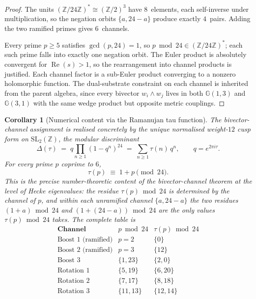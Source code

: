 \documentclass[11pt,a4paper]{article}
\theoremstyle{plain}
\newtheorem{corollary}[theorem]{Corollary}
\theoremstyle{definition}
\theoremstyle{remark}
\numberwithin{equation}{section}
\newcommand{\Cl}{\mathbb{G}}
\begin{document}
\begin{proof}
The units \((\mathbb{Z}/24\mathbb{Z})^*\cong(\mathbb{Z}/2)^3\) have
\(8\)~elements, each self-inverse under multiplication, so the negation
orbits \(\{a,24-a\}\) produce exactly \(4\)~pairs.  Adding the two
ramified primes gives \(6\)~channels.

Every prime \(p\ge5\) satisfies \(\gcd(p,24)=1\), so
\(p\bmod 24\in(\mathbb{Z}/24\mathbb{Z})^*\); each such prime falls
into exactly one negation orbit.  The Euler product is absolutely
convergent for \(\operatorname{Re}(s)>1\), so the rearrangement into
channel products is justified.  Each channel factor is a sub-Euler
product converging to a nonzero holomorphic function.  The
dual-substrate constraint on each channel is inherited from the parent
algebra, since every bivector \(w_i\wedge w_j\) lives in both
\(\Cl(1,3)\) and \(\Cl(3,1)\) with the same wedge product but opposite
metric couplings.
\end{proof}

\begin{corollary}[Numerical content via the Ramanujan tau function]
\label{cor:wilton-channel-content}
The bivector-channel assignment is realised concretely by the unique
normalised weight-\(12\) cusp form on \(\mathrm{SL}_2(\mathbb{Z})\),
the modular discriminant
\[
  \Delta(\tau) \;=\; q\prod_{n\ge1}(1-q^n)^{24} \;=\;
  \sum_{n\ge1}\tau(n)\,q^n,
  \qquad q = e^{2\pi i\tau}.
\]
For every prime \(p\) coprime to \(6\),
\begin{equation}
  \tau(p)\;\equiv\;1+p \pmod{24}.
  \label{eq:wilton-mod24}
\end{equation}
This is the precise number-theoretic content of the bivector-channel
theorem at the level of Hecke eigenvalues: the residue \(\tau(p)\bmod
24\) is determined by the channel of \(p\), and within each unramified
channel \(\{a,24-a\}\) the two residues \((1+a)\bmod 24\) and
\((1+(24-a))\bmod 24\) are the only values \(\tau(p)\bmod 24\)
takes.  The complete table is
\[
\begin{array}{lll}
\textbf{Channel} & p\bmod 24 & \tau(p)\bmod 24 \\
\hline
\text{Boost~1 (ramified)} & p=2  & \{0\}  \\
\text{Boost~2 (ramified)} & p=3  & \{12\}  \\
\text{Boost~3} & \{1,23\} & \{2,0\} \\
\text{Rotation~1} & \{5,19\} & \{6,20\} \\
\text{Rotation~2} & \{7,17\} & \{8,18\} \\
\text{Rotation~3} & \{11,13\} & \{12,14\} \\
\end{array}
\]
\end{corollary}
\end{document}
